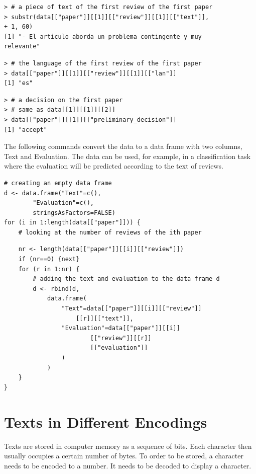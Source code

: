 \documentclass[11pt,openany,executivepaper]{book}
\begin{document}
\begin{verbatim}
> # a piece of text of the first review of the first paper
> substr(data[["paper"]][[1]][["review"]][[1]][["text"]],
+ 1, 60)
[1] "- El articulo aborda un problema contingente y muy
relevante"
\end{verbatim}

\begin{verbatim}
> # the language of the first review of the first paper
> data[["paper"]][[1]][["review"]][[1]][["lan"]]
[1] "es"
\end{verbatim}

\begin{verbatim}
> # a decision on the first paper
> # same as data[[1]][[1]][[2]]
> data[["paper"]][[1]][["preliminary_decision"]]
[1] "accept"
\end{verbatim}

The following commands convert the data to a data frame with two columns, Text and Evaluation. The data can be used, for example, in a classification task where the evaluation will be predicted according to the text of reviews.

\begin{verbatim}
# creating an empty data frame
d <- data.frame("Text"=c(),
        "Evaluation"=c(),
        stringsAsFactors=FALSE)
for (i in 1:length(data[["paper"]])) {
    # looking at the number of reviews of the ith paper
\end{verbatim}

\begin{verbatim}
    nr <- length(data[["paper"]][[i]][["review"]])
    if (nr==0) {next}
    for (r in 1:nr) {
        # adding the text and evaluation to the data frame d
        d <- rbind(d,
            data.frame(
                "Text"=data[["paper"]][[i]][["review"]]
                    [[r]][["text"]],
                "Evaluation"=data[["paper"]][[i]]
                        [["review"]][[r]]
                        [["evaluation"]]
                )
            )
    }
}
\end{verbatim}

\section{Texts in Different Encodings}
Texts are stored in computer memory as a sequence of bits. Each character then usually occupies a certain number of bytes. To order to be stored, a character needs to be encoded to a number. It needs to be decoded to display a character.
\end{document}
